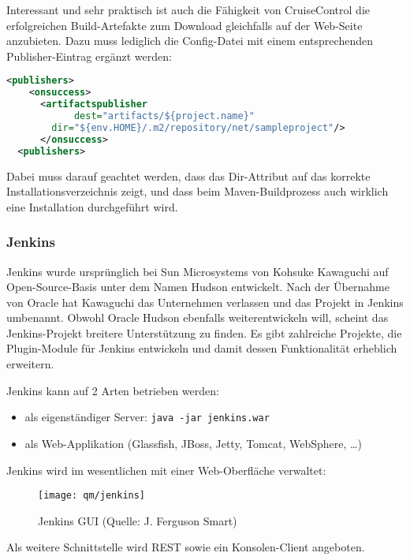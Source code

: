\newslide
Interessant und sehr praktisch ist auch die Fähigkeit von CruiseControl die
erfolgreichen Build-Artefakte zum Download gleichfalls auf der Web-Seite
anzubieten. Dazu muss lediglich die Config-Datei mit einem entsprechenden
Publisher-Eintrag ergänzt werden:
\begin{lstlisting}[language=xml,
  morekeywords={publishers,onsuccess,artifactspublisher}]
  <publishers>
    <onsuccess>
      <artifactspublisher
            dest="artifacts/${project.name}"
	    dir="${env.HOME}/.m2/repository/net/sampleproject"/>
      </onsuccess>
  <publishers>
\end{lstlisting}
Dabei muss darauf geachtet werden, dass das Dir-Attribut auf das
korrekte Installationsverzeichnis zeigt, und dass beim
Maven-Buildprozess auch wirklich eine Installation durchgeführt wird.
%
\subsubsection{Jenkins}
Jenkins wurde ursprünglich bei Sun Microsystems von Kohsuke Kawaguchi
auf Open-Source-Basis unter dem Namen Hudson entwickelt. Nach der
Übernahme von Oracle hat Kawaguchi das Unternehmen verlassen und das
Projekt in Jenkins umbenannt. Obwohl Oracle Hudson ebenfalls
weiterentwickeln will, scheint das Jenkins-Projekt breitere
Unterstützung  zu finden.
Es gibt zahlreiche Projekte, die Plugin-Module
für Jenkins entwickeln und damit dessen Funktionalität erheblich
erweitern.

Jenkins kann auf 2 Arten betrieben werden:
\begin{itemize}
\item als eigenständiger Server: \verb+java -jar jenkins.war+
\item als Web-Applikation (Glassfish, JBoss, Jetty, Tomcat, WebSphere,
  \ldots)
\end{itemize}
Jenkins wird im wesentlichen mit einer Web-Oberfläche verwaltet:
\begin{figure}[H]
  \centering
  \texttt{[image: qm/jenkins]}
  \caption{Jenkins GUI (Quelle: J. Ferguson Smart)}
  \label{fig:jenkins}
\end{figure}
Als weitere Schnittstelle wird REST sowie ein
Konsolen-Client angeboten.

